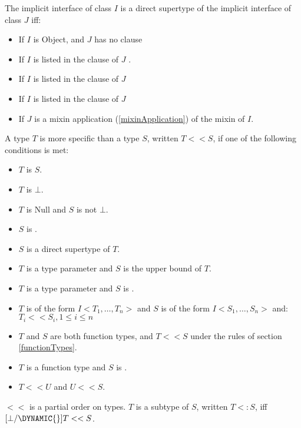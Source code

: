 \documentclass{article}
\newcommand{\code}[1]{{\sf #1}}
\begin{document}
\LMHash{}
The implicit interface of class $I$ is a direct supertype of the implicit interface of class  $J$ iff:
\begin{itemize}
\item
If $I$ is \code{Object}, and $J$ has no \EXTENDS{} clause%
\item
If $I$ is listed in the \EXTENDS{} clause of $J$%
.
\item If $I$ is listed in the \IMPLEMENTS{} clause of $J$

\item If $I$ is listed in the \WITH{} clause of $J$

\item If $J$ is a mixin application (\ref{mixinApplication}) of the mixin of $I$.
\end{itemize}


\LMHash{}
A type $T$ is more specific than a type $S$, written $T << S$,  if one of the following conditions is met:
\begin{itemize}
\item $T$ is $S$.
\item $T$ is $\bot$.
\item $T$ is \code{Null} and $S$ is not $\bot$.
\item $S$ is \DYNAMIC{}.
\item $S$ is a direct supertype of $T$.
\item $T$ is a type parameter and $S$ is the upper bound of $T$.
\item $T$ is a type parameter and $S$ is .
\item $T$ is of the form $I<T_1, \ldots, T_n>$ and $S$ is of the form $I<S_1, \ldots, S_n>$ and:
$T_i << S_i, 1 \le i \le n$
\item $T$ and $S$ are both function types, and $T << S$ under the rules of section \ref{functionTypes}.
\item $T$ is a function type and $S$ is .
\item $T << U$ and $U << S$.
\end{itemize}

\LMHash{}
$<<$ is a partial order on types.
$T$ is a subtype of $S$, written $T <: S$, iff $[\bot/\DYNAMIC{}]T << S$.
\end{document}
